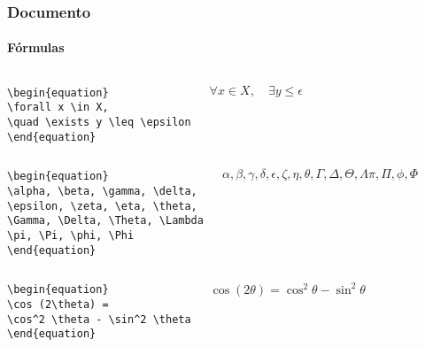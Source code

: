 \begin{frame}[fragile]
\frametitle{Documento}
\framesubtitle{Fórmulas}
  \scriptsize
  \begin{columns}[c]
  \begin{verbatim}
\begin{equation}
\forall x \in X, 
\quad \exists y \leq \epsilon
\end{equation}
  \end{verbatim}
  \begin{fmpage}{\textwidth}
\begin{equation}
\forall x \in X, 
\quad \exists y \leq \epsilon
\end{equation}
  \end{fmpage}
  \end{columns}

  \begin{columns}[c]
  \begin{verbatim}
\begin{equation}
\alpha, \beta, \gamma, \delta,
\epsilon, \zeta, \eta, \theta,
\Gamma, \Delta, \Theta, \Lambda
\pi, \Pi, \phi, \Phi
\end{equation}
  \end{verbatim}
  \begin{fmpage}{\textwidth}
\begin{equation}
\alpha, \beta, \gamma, \delta,
\epsilon, \zeta, \eta, \theta,
\Gamma, \Delta, \Theta, \Lambda
\pi, \Pi, \phi, \Phi
\end{equation}
  \end{fmpage}
  \end{columns}


  \begin{columns}[c]
  \begin{verbatim}
\begin{equation}
\cos (2\theta) = 
\cos^2 \theta - \sin^2 \theta
\end{equation}
  \end{verbatim}
  \begin{fmpage}{\textwidth}
\begin{equation}
\cos (2\theta) = 
\cos^2 \theta - \sin^2 \theta
\end{equation}
  \end{fmpage}
  \end{columns}
\end{frame}


